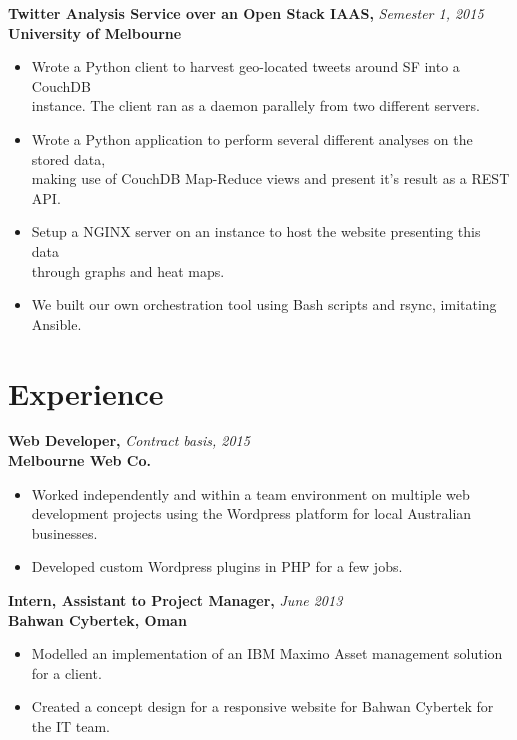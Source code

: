 \documentclass[a4paper,overlapped]{res}
\begin{document}
\begin{resume}
  \textbf{Twitter Analysis Service over an Open Stack IAAS,} 
  \hfill \textit{Semester 1, 2015}\\
  \textbf{University of Melbourne}
  \begin{itemize}
  \item Wrote a Python client to harvest geo-located tweets around SF into a
    CouchDB \\
    instance. The client ran as a daemon parallely from two different servers.
  \item Wrote a Python application to perform several different analyses on the
    stored data, \\
    making use of CouchDB Map-Reduce views and present it's result
    as a REST API.
  \item Setup a NGINX server on an instance to host the website presenting this
    data \\ through graphs and heat maps.
  \item We built our own orchestration tool using Bash scripts and rsync,
    imitating Ansible.
    
  \end{itemize}
  

  \section{Experience}

  \textbf{Web Developer,} \hfill \textit{Contract basis, 2015}\\
  \textbf{Melbourne Web Co.}
  \begin{itemize}
  \item Worked independently and within a team environment on multiple web 
    development projects using the Wordpress platform for local Australian businesses.
  \item Developed custom Wordpress plugins in PHP for a few jobs.  
  \end{itemize}
  
  \textbf{Intern, Assistant to Project Manager,}  \hfill \textit{June 2013}\\
  \textbf{Bahwan Cybertek, Oman}
  \begin{itemize}
  \item Modelled an implementation of an IBM Maximo Asset management 
    solution for a client. 
  \item Created a concept design for a responsive website for Bahwan Cybertek 
    for the IT team. 
  \end{itemize}


\end{resume}
\end{document}
